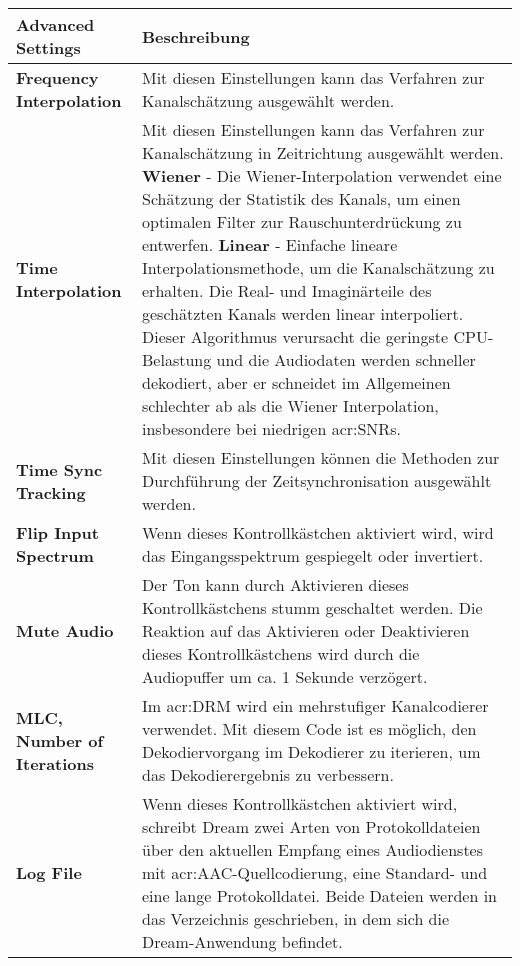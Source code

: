\begin{table}[htb]
	\begin{center}
		\begin{tabular}{p{0.25\linewidth} p{0.75\linewidth}}	
			\toprule
			\textbf{Advanced Settings} & \textbf{Beschreibung}\\
			\midrule
			\textbf{Frequency Interpolation} & Mit diesen Einstellungen kann das Verfahren zur Kanalschätzung ausgewählt werden.\\
			
			\textbf{Time Interpolation} & Mit diesen Einstellungen kann das Verfahren zur Kanalschätzung in Zeitrichtung ausgewählt werden.\newline
			\textbf{Wiener} - Die Wiener-Interpolation verwendet eine Schätzung der Statistik des Kanals, um einen optimalen Filter zur Rauschunterdrückung zu entwerfen.\newline
			\textbf{Linear} - Einfache lineare Interpolationsmethode, um die Kanalschätzung zu erhalten. Die Real- und Imaginärteile des geschätzten Kanals werden linear interpoliert. Dieser Algorithmus verursacht die geringste CPU-Belastung und die Audiodaten werden schneller dekodiert, aber er schneidet im Allgemeinen schlechter ab als die Wiener Interpolation, insbesondere bei niedrigen \gls{acr:SNR}s.\\
			
			\textbf{Time Sync Tracking} & 	Mit diesen Einstellungen können die Methoden zur Durchführung der Zeitsynchronisation ausgewählt werden. \\
			
			\textbf{Flip Input Spectrum} & Wenn dieses Kontrollkästchen aktiviert wird, wird das Eingangsspektrum gespiegelt oder invertiert.
			\\
			
			\textbf{Mute Audio} & Der Ton kann durch Aktivieren dieses Kontrollkästchens stumm geschaltet werden. Die Reaktion auf das Aktivieren oder Deaktivieren dieses Kontrollkästchens wird durch die Audiopuffer um ca. 1 Sekunde verzögert.
			\\
			
			\textbf{MLC, Number of Iterations} & Im \gls{acr:DRM} wird ein  mehrstufiger Kanalcodierer verwendet. Mit diesem Code ist es möglich, den Dekodiervorgang im Dekodierer zu iterieren, um das Dekodierergebnis zu verbessern. \\
			
			\textbf{Log File} & Wenn dieses Kontrollkästchen aktiviert wird, schreibt Dream zwei Arten von Protokolldateien über den aktuellen Empfang eines Audiodienstes mit \gls{acr:AAC}-Quellcodierung, eine Standard- und eine lange Protokolldatei. Beide Dateien werden in das Verzeichnis geschrieben, in dem sich die Dream-Anwendung befindet.\\
			

\end{tabular}
\end{center}
\end{table}
